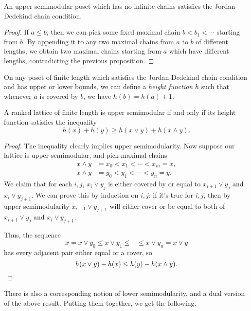 \documentclass[letterpaper,11pt]{article}
\begin{document}
\begin{cor} An upper semimodular poset which has no infinite chains satisfies the Jordan-Dedekind chain condition.
\end{cor}
\begin{proof} If $a \le b$, then we can pick some fixed maximal chain $b < b_1 < \cdots$ starting from $b$. By appending it to any two maximal chains from $a$ to $b$ of different lengths, we obtain two maximal chains starting from $a$ which have different lengths, contradicting the previous proposition.
\end{proof}

On any poset of finite length which satisfies the Jordan-Dedekind chain condition and has upper or lower bounds, we can define a \emph{height function} $h$ such that whenever $a$ is covered by $b$, we have $h(b) = h(a)+1$.

\begin{prop} A ranked lattice of finite length is upper semimodular if and only if its height function satisfies the inequality
\[
h(x) + h(y) \ge h(x \vee y) + h(x \wedge y).
\]
\end{prop}
\begin{proof} The inequality clearly implies upper semimodularity. Now suppose our lattice is upper semimodular, and pick maximal chains
\begin{align*}
x\wedge y &= x_0 < x_1 < \cdots < x_m = x,\\
x\wedge y &= y_0 < y_1 < \cdots < y_n = y.
\end{align*}
We claim that for each $i,j$, $x_i \vee y_j$ is either covered by or equal to $x_{i+1} \vee y_j$ and $x_i \vee y_{j+1}$. We can prove this by induction on $i,j$: if it's true for $i,j$, then by upper semimodularity $x_{i+1} \vee y_{j+1}$ will either cover or be equal to both of $x_{i+1} \vee y_j$ and $x_i \vee y_{j+1}$.

Thus, the sequence
\[
x = x \vee y_0 \le x \vee y_1 \le \cdots \le x \vee y_n = x \vee y
\]
has every adjacent pair either equal or a cover, so
\[
h(x \vee y) - h(x) \le h(y) - h(x \wedge y).\qedhere
\]
\end{proof}

There is also a corresponding notion of lower semimodularity, and a dual version of the above result. Putting them together, we get the following.
\end{document}
